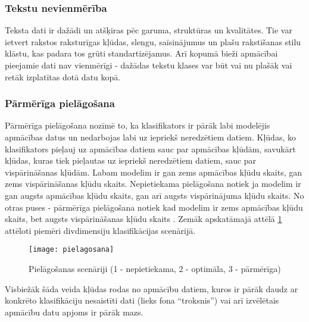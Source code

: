 \subsubsection{Tekstu nevienmērība}
Teksta dati ir dažādi un atšķiras pēc garuma, struktūras un kvalitātes. Tie var ietvert rakstos raksturīgas kļūdas, slengu, saīsinājumus un plašu rakstīšanas stilu klāstu, kas padara tos grūti standartizējamus. Arī kopumā bieži apmācībai pieejamie dati nav vienmērīgi - dažādas tekstu klases var būt vai nu plašāk vai retāk izplatītas dotā datu kopā.

\subsubsection{Pārmērīga pielāgošana}
Pārmērīga pielāgošana nozīmē to, ka klasifikators ir pārāk labi modelējis apmācības datus
un nedarbojas labi uz iepriekš neredzētiem datiem. Kļūdas, ko klasifikators pieļauj uz apmācības datiem sauc par apmācības kļūdām, savukārt kļūdas, kuras tiek pieļautas uz iepriekš neredzētiem datiem, sauc par vispārināšanas kļūdām. Labam modelim ir gan zems apmācības kļūdu skaits, gan zems vispārināšanas kļūdu skaits. Nepietiekama pielāgošana notiek ja modelim ir gan augsts apmācības kļūdu skaits, gan arī augsts vispārinājuma kļūdu skaits. No otras puses - pārmērīga pielāgošana notiek kad modelim ir zems apmācības kļūdu skaits, bet augsts vispārināšanas kļūdu skaits \cite{tan2005introduction}. Zemāk apskatāmajā attēlā \ref{fig:pielagosana} attēloti piemēri divdimensiju klasifikācijas scenārijā.

\begin{figure}[H]
	\texttt{[image: pielagosana]}
	\caption{Pielāgošanas scenāriji (1 - nepietiekama, 2 - optimāla, 3 - pārmērīga)}
	\label{fig:pielagosana}
\end{figure}
 
Visbiežāk šāda veida kļūdas rodas no apmācību datiem, kuros ir pārāk daudz ar konkrēto klasifikāciju nesaistīti dati (lieks fona “troksnis”) vai arī izvēlētais apmācību datu apjoms ir pārāk mazs.
